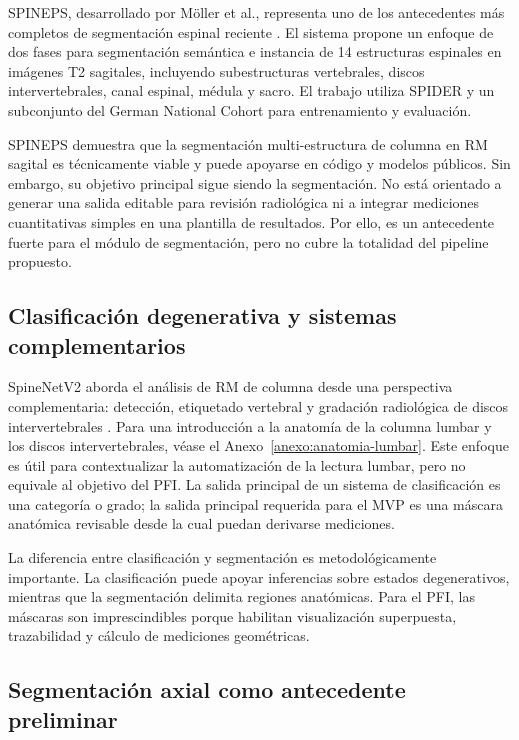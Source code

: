 SPINEPS, desarrollado por Möller et al., representa uno de los antecedentes más completos de segmentación espinal reciente \parencite{moller_spineps_2025}. El sistema propone un enfoque de dos fases para segmentación semántica e instancia de 14 estructuras espinales en imágenes T2 sagitales, incluyendo subestructuras vertebrales, discos intervertebrales, canal espinal, médula y sacro. El trabajo utiliza SPIDER y un subconjunto del German National Cohort para entrenamiento y evaluación.

SPINEPS demuestra que la segmentación multi-estructura de columna en RM sagital es técnicamente viable y puede apoyarse en código y modelos públicos. Sin embargo, su objetivo principal sigue siendo la segmentación. No está orientado a generar una salida editable para revisión radiológica ni a integrar mediciones cuantitativas simples en una plantilla de resultados. Por ello, es un antecedente fuerte para el módulo de segmentación, pero no cubre la totalidad del pipeline propuesto.

\subsection{Clasificación degenerativa y sistemas complementarios}

SpineNetV2 aborda el análisis de RM de columna desde una perspectiva complementaria: detección, etiquetado vertebral y gradación radiológica de discos intervertebrales \parencite{jamaludin_spinenet_2017,windsor_spinenet_2024}. Para una introducción a la anatomía de la columna lumbar y los discos intervertebrales, véase el Anexo~\ref{anexo:anatomia-lumbar}. Este enfoque es útil para contextualizar la automatización de la lectura lumbar, pero no equivale al objetivo del PFI. La salida principal de un sistema de clasificación es una categoría o grado; la salida principal requerida para el MVP es una máscara anatómica revisable desde la cual puedan derivarse mediciones.

La diferencia entre clasificación y segmentación es metodológicamente importante. La clasificación puede apoyar inferencias sobre estados degenerativos, mientras que la segmentación delimita regiones anatómicas. Para el PFI, las máscaras son imprescindibles porque habilitan visualización superpuesta, trazabilidad y cálculo de mediciones geométricas.

\subsection{Segmentación axial como antecedente preliminar}

